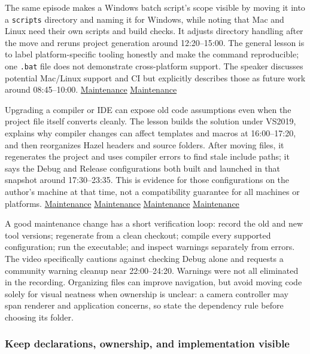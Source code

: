 The same episode makes a Windows batch script's scope visible by moving it into a \texttt{scripts} directory and naming it for Windows, while noting that Mac and Linux need their own scripts and build checks. It adjusts directory handling after the move and reruns project generation around 12:20--15:00. The general lesson is to label platform-specific tooling honestly and make the command reproducible; one \texttt{.bat} file does not demonstrate cross-platform support. The speaker discusses potential Mac/Linux support and CI but explicitly describes those as future work around 08:45--10:00. \href{https://www.youtube.com/watch?v=e9uTV44oOiw&t=740s}{Maintenance} \href{https://www.youtube.com/watch?v=e9uTV44oOiw&t=525s}{Maintenance}

Upgrading a compiler or IDE can expose old code assumptions even when the project file itself converts cleanly. The lesson builds the solution under VS2019, explains why compiler changes can affect templates and macros at 16:00--17:20, and then reorganizes Hazel headers and source folders. After moving files, it regenerates the project and uses compiler errors to find stale include paths; it says the Debug and Release configurations both built and launched in that snapshot around 17:30--23:35. This is evidence for those configurations on the author's machine at that time, not a compatibility guarantee for all machines or platforms. \href{https://www.youtube.com/watch?v=e9uTV44oOiw&t=960s}{Maintenance} \href{https://www.youtube.com/watch?v=e9uTV44oOiw&t=1050s}{Maintenance} \href{https://www.youtube.com/watch?v=e9uTV44oOiw&t=1320s}{Maintenance} \href{https://www.youtube.com/watch?v=e9uTV44oOiw&t=1410s}{Maintenance}

A good maintenance change has a short verification loop: record the old and new tool versions; regenerate from a clean checkout; compile every supported configuration; run the executable; and inspect warnings separately from errors. The video specifically cautions against checking Debug alone and requests a community warning cleanup near 22:00--24:20. Warnings were not all eliminated in the recording. Organizing files can improve navigation, but avoid moving code solely for visual neatness when ownership is unclear: a camera controller may span renderer and application concerns, so state the dependency rule before choosing its folder.

\subsubsection{Keep declarations, ownership, and implementation visible}\label{05-engine-i-ch013-keep-declarations-ownership-and-implementation-visible}

